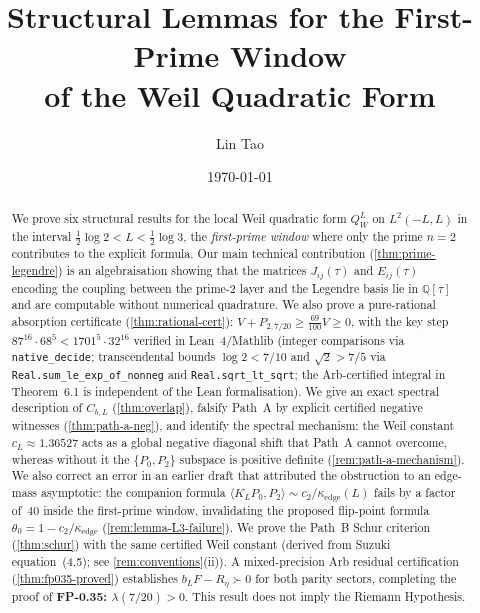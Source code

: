 \documentclass[12pt,a4paper]{amsart}
\title{Structural Lemmas for the First-Prime Window\\
       of the Weil Quadratic Form}
\author{Lin Tao}
\date{\today}
\theoremstyle{plain}
\theoremstyle{definition}
\newcommand{\ctwo}{c_2}              %
\newcommand{\kappae}{\kappa_{\mathrm{edge}}}
\begin{document}
\begin{abstract}
We prove six structural results for the local Weil quadratic form
$Q_W^L$ on $L^2(-L,L)$ in the interval
$\tfrac{1}{2}\log 2 < L < \tfrac{1}{2}\log 3$,
the \emph{first-prime window} where only the prime $n = 2$ contributes
to the explicit formula.
Our main technical contribution (\cref{thm:prime-legendre}) is an
algebraisation showing that the matrices $J_{ij}(\tau)$ and $E_{ij}(\tau)$
encoding the coupling between the prime-2 layer and the Legendre basis lie in
$\mathbb{Q}[\tau]$ and are computable without numerical quadrature.
We also prove a pure-rational absorption certificate (\cref{thm:rational-cert}):
$V + P_{2,7/20} \ge \tfrac{69}{100}V \ge 0$, with the key step
$87^{16}\cdot 68^5 < 1701^5\cdot 32^{16}$ verified in Lean~4/Mathlib
(integer comparisons via \texttt{native\_decide}; transcendental bounds
$\log 2 < 7/10$ and $\sqrt{2} > 7/5$ via \texttt{Real.sum\_le\_exp\_of\_nonneg}
and \texttt{Real.sqrt\_lt\_sqrt}; the Arb-certified integral in Theorem~6.1
is independent of the Lean formalisation).
We give an exact spectral description of $C_{b,L}$ (\cref{thm:overlap}),
falsify Path~A by explicit certified negative witnesses (\cref{thm:path-a-neg}),
and identify the spectral mechanism: the Weil constant $c_L \approx 1.36527$
acts as a global negative diagonal shift that Path~A cannot overcome, whereas
without it the $\{P_0,P_2\}$ subspace is positive definite
(\cref{rem:path-a-mechanism}). We also correct an error in an earlier draft
that attributed the obstruction to an edge-mass asymptotic: the companion
formula $\langle K_LP_0,P_2\rangle \sim \ctwo/\kappae(L)$ fails by a factor
of~$40$ inside the first-prime window, invalidating the proposed flip-point
formula $\theta_0 = 1 - \ctwo/\kappae$ (\cref{rem:lemma-L3-failure}).
We prove the Path~B Schur criterion (\cref{thm:schur}) with the same certified
Weil constant (derived from Suzuki~\cite{Suzuki2026} equation~(4.5); see
\cref{rem:conventions}(ii)).
A mixed-precision Arb residual certification (\cref{thm:fp035-proved}) establishes
$b_L F - R_\eta \succ 0$ for both parity sectors, completing the proof of
\textbf{FP-0.35: $\lambda(7/20) > 0$}.
This result does not imply the Riemann Hypothesis.
\end{abstract}

\maketitle

\tableofcontents
\end{document}
